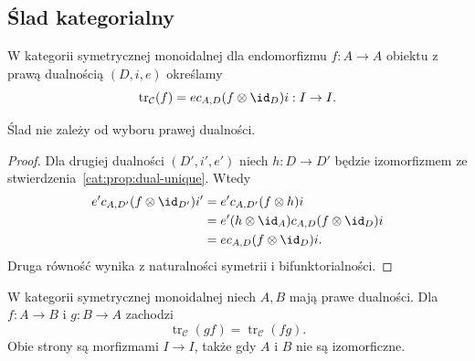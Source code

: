 \subsection{Ślad kategorialny}
\begin{definicja}[Ślad]\label{cat:def:categorical-trace}
W kategorii symetrycznej monoidalnej dla endomorfizmu $f:A\to A$ obiektu z prawą dualnością $(D,i,e)$ określamy
\[
\operatorname{tr}_{\mathcal C}(f)=e c_{A,D}(f\otimes\id_D)i:I\to I.
\]
\end{definicja}
\begin{center}
\end{center}
\begin{stwierdzenie}\label{cat:prop:trace-independent}
Ślad nie zależy od wyboru prawej dualności.
\end{stwierdzenie}
\begin{proof}
Dla drugiej dualności $(D',i',e')$ niech $h:D\to D'$ będzie izomorfizmem ze stwierdzenia~\ref{cat:prop:dual-unique}. Wtedy
\[
\begin{aligned}
e'c_{A,D'}(f\otimes\id_{D'})i'
&=e'c_{A,D'}(f\otimes h)i\\
&=e'(h\otimes\id_A)c_{A,D}(f\otimes\id_D)i\\
&=ec_{A,D}(f\otimes\id_D)i.
\end{aligned}
\]
Druga równość wynika z naturalności symetrii i bifunktorialności.
\end{proof}
\begin{stwierdzenie}\label{cat:prop:trace-cyclic}
W kategorii symetrycznej monoidalnej niech $A,B$ mają prawe dualności. Dla $f:A\to B$ i $g:B\to A$ zachodzi
\[
\operatorname{tr}_{\mathcal C}(gf)=\operatorname{tr}_{\mathcal C}(fg).
\]
Obie strony są morfizmami $I\to I$, także gdy $A$ i $B$ nie są izomorficzne.
\end{stwierdzenie}
